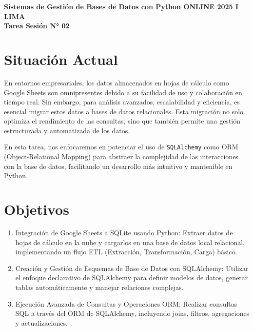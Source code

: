 \documentclass[12pt,a4paper]{article}
\begin{document}
\begin{center}
\Large \textbf{Sistemas de Gestión de Bases de Datos con Python ONLINE 2025 I LIMA}\\[1ex]
\large \textbf{Tarea Sesión N° 02}
\end{center}

\section*{Situación Actual}
En entornos empresariales, los datos almacenados en hojas de cálculo como Google Sheets son omnipresentes debido a su facilidad de uso y colaboración en tiempo real. Sin embargo, para análisis avanzados, escalabilidad y eficiencia, es esencial migrar estos datos a bases de datos relacionales. Esta migración no solo optimiza el rendimiento de las consultas, sino que también permite una gestión estructurada y automatizada de los datos. 

En esta tarea, nos enfocaremos en potenciar el uso de \texttt{SQLAlchemy} como ORM (Object-Relational Mapping) para abstraer la complejidad de las interacciones con la base de datos, facilitando un desarrollo más intuitivo y mantenible en Python.

\section*{Objetivos}
\begin{enumerate}
  \item Integración de Google Sheets a SQLite usando Python: Extraer datos de hojas de cálculo en la nube y cargarlos en una base de datos local relacional, implementando un flujo ETL (Extracción, Transformación, Carga) básico.
  \item Creación y Gestión de Esquemas de Base de Datos con SQLAlchemy: Utilizar el enfoque declarativo de SQLAlchemy para definir modelos de datos, generar tablas automáticamente y manejar relaciones complejas.
  \item Ejecución Avanzada de Consultas y Operaciones ORM: Realizar consultas SQL a través del ORM de SQLAlchemy, incluyendo joins, filtros, agregaciones y actualizaciones.
\end{enumerate}
\end{document}
